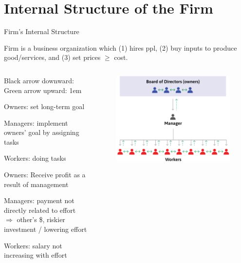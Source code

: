 \documentclass[11pt,aspectratio=43,usenames,dvipsnames]{beamer}
\let\olditemize=\itemize
\let\endolditemize=\enditemize
\renewenvironment{itemize}{\olditemize \itemsep1em}{\endolditemize}
\theoremstyle{definition}
\begin{document}
\section[Internal]{Internal Structure of the Firm}
\label{sec:Internal_Structure_of_the_Firm}

\begin{frame}{Firm's Internal Structure}
\label{slide:Firm_s_Internal_Structure}
    \begin{definition}
        Firm is a business organization which (1) hires ppl, (2) buy inputs to produce good/services, and (3) set prices $ \ge  $ cost.
    \end{definition}
    \begin{columns}
        \begin{column}{0.5\textwidth}
         {Black arrow downward: }
         {Green arrow upward: }
        \begin{itemize}
             { \item Owners: set long-term goal }
             { \item Managers: implement owners' goal by assigning tasks }
             { \item Workers: doing tasks }
             { \item Owners: Receive profit as a result of management}
             { \item Managers: payment not directly related to effort $ \Rightarrow  $ other's \$, riskier investment / lowering effort }
             { \item Workers: salary not increasing with effort}
        \end{itemize}
        \end{column}
        \begin{column}{0.5\textwidth}
            \begin{figure}
                \centering
                \includegraphics[width=\textwidth]{./figures/firmStructure.png}
            \end{figure}

        \end{column}
    \end{columns}

\end{frame}
\end{document}
